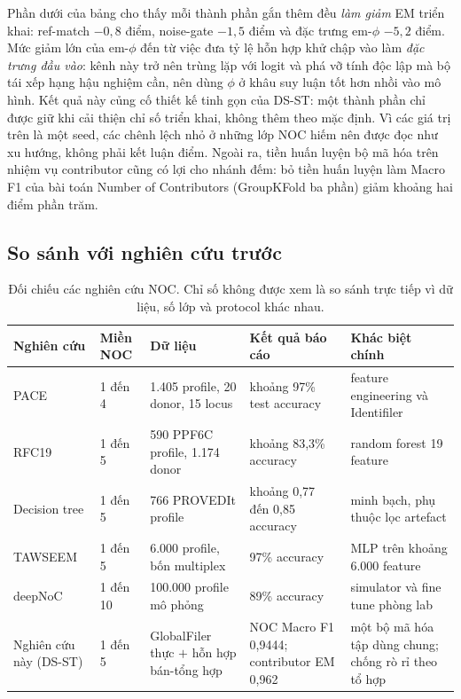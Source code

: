 \documentclass[12pt,a4paper]{article}
\begin{document}
Phần dưới của bảng cho thấy mỗi thành phần gắn thêm đều \emph{làm giảm} EM triển khai: ref-match \(-0,8\) điểm, noise-gate \(-1,5\) điểm và đặc trưng em-\(\phi\) \(-5,2\) điểm. Mức giảm lớn của em-\(\phi\) đến từ việc đưa tỷ lệ hỗn hợp khử chập vào làm \emph{đặc trưng đầu vào}: kênh này trở nên trùng lặp với logit và phá vỡ tính độc lập mà bộ tái xếp hạng hậu nghiệm cần, nên dùng \(\phi\) ở khâu suy luận tốt hơn nhồi vào mô hình. Kết quả này củng cố thiết kế tinh gọn của DS-ST: một thành phần chỉ được giữ khi cải thiện chỉ số triển khai, không thêm theo mặc định. Vì các giá trị trên là một seed, các chênh lệch nhỏ ở những lớp NOC hiếm nên được đọc như xu hướng, không phải kết luận điểm. Ngoài ra, tiền huấn luyện bộ mã hóa trên nhiệm vụ contributor cũng có lợi cho nhánh đếm: bỏ tiền huấn luyện làm Macro F1 của bài toán Number of Contributors (GroupKFold ba phần) giảm khoảng hai điểm phần trăm.

\subsection{So sánh với nghiên cứu trước}

\begin{table}[H]
\centering
\caption{Đối chiếu các nghiên cứu NOC. Chỉ số không được xem là so sánh trực tiếp vì dữ liệu, số lớp và protocol khác nhau.}
\label{tab:related_compare}
\small
\begin{tabularx}{\textwidth}{P{2.5cm}P{1.7cm}P{2.5cm}P{2.3cm}Y}
\toprule
\textbf{Nghiên cứu} & \textbf{Miền NOC} & \textbf{Dữ liệu} & \textbf{Kết quả báo cáo} & \textbf{Khác biệt chính} \\
\midrule
PACE \cite{marciano2017} & 1 đến 4 & 1.405 profile, 20 donor, 15 locus & khoảng 97\% test accuracy & feature engineering và Identifiler \\
RFC19 \cite{benschop2019} & 1 đến 5 & 590 PPF6C profile, 1.174 donor & khoảng 83,3\% accuracy & random forest 19 feature \\
Decision tree \cite{kruijver2021} & 1 đến 5 & 766 PROVEDIt profile & khoảng 0,77 đến 0,85 accuracy & minh bạch, phụ thuộc lọc artefact \\
TAWSEEM \cite{alamoudi2022} & 1 đến 5 & 6.000 profile, bốn multiplex & 97\% accuracy & MLP trên khoảng 6.000 feature \\
deepNoC \cite{taylor2024deepnoc} & 1 đến 10 & 100.000 profile mô phỏng & 89\% accuracy & simulator và fine tune phòng lab \\
Nghiên cứu này (DS-ST) & 1 đến 5 & GlobalFiler thực \(+\) hỗn hợp bán-tổng hợp & NOC Macro F1 0,9444; contributor EM 0,962 & một bộ mã hóa tập dùng chung; chống rò rỉ theo tổ hợp \\
\bottomrule
\end{tabularx}
\end{table}
\end{document}

